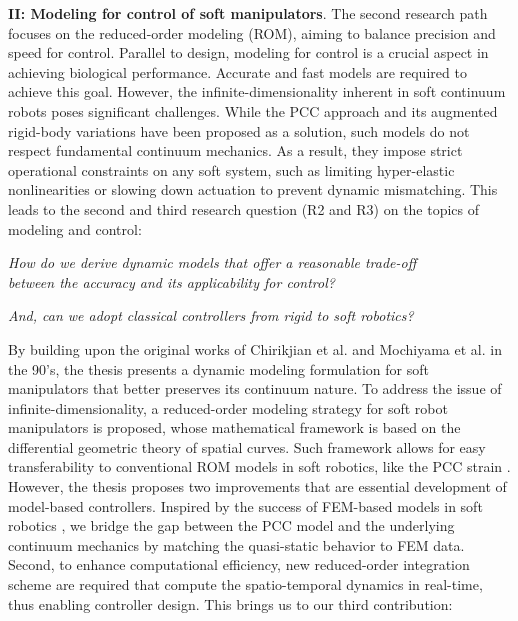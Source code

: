 \textbf{II: Modeling for control of soft manipulators}. The second research path focuses on the reduced-order modeling (ROM), aiming to balance precision and speed for control. Parallel to design, modeling for control is a crucial aspect in achieving biological performance. Accurate and fast models are required to achieve this goal. However, the infinite-dimensionality inherent in soft continuum robots poses significant challenges. While the PCC approach and its augmented rigid-body variations have been proposed as a solution, such models do not respect fundamental continuum mechanics. As a result, they impose strict operational constraints on any soft system, such as limiting hyper-elastic nonlinearities or slowing down actuation to prevent dynamic mismatching. This leads to the second and third research question (R2 and R3) on the topics of modeling and control: %
%
\begin{center}
\textit{
How do we derive dynamic models that offer a reasonable trade-off \\ between the accuracy and its applicability for control? }
\end{center}
\begin{center}
\textit{And, can we adopt classical controllers from rigid to soft robotics?}
\end{center}
%
By building upon the original works of Chirikjian et al. \cite{Chirikjian1992} and Mochiyama et al. \cite{Mochiyama1992} in the 90's, the thesis presents a dynamic modeling formulation for soft manipulators that better preserves its continuum nature. To address the issue of infinite-dimensionality, a reduced-order modeling strategy for soft robot manipulators is proposed, whose mathematical framework is based on the differential geometric theory of spatial curves. Such framework allows for easy transferability to conventional ROM models in soft robotics, like the PCC strain \cite{DellaSantina2020,Katzschmann2019,Falkenhahn2015}. However, the thesis proposes two improvements that are essential development of model-based controllers. Inspired by the success of FEM-based models in soft robotics \cite{Duriez2013,Goury2018}, we bridge the gap between the PCC model and the underlying continuum mechanics by matching the quasi-static behavior to FEM data. Second, to enhance computational efficiency, new reduced-order integration scheme are required that compute the spatio-temporal dynamics in real-time, thus enabling controller design. This brings us to our third contribution: 

